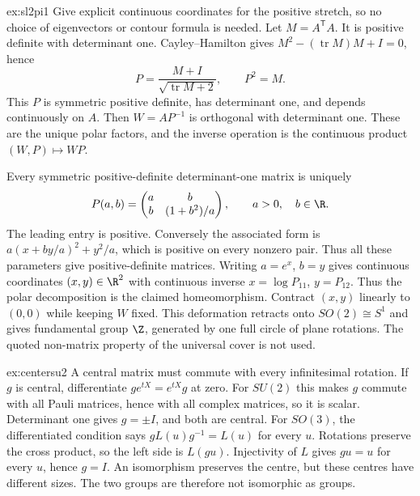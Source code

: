 \begin{solution}{ex:sl2pi1}
\idea Give explicit continuous coordinates for the positive stretch, so
no choice of eigenvectors or contour formula is needed.
\writeup Let $M=A^{\mathsf T}A$. It is positive definite with determinant
one. Cayley--Hamilton gives $M^2-(\operatorname{tr}M)M+I=0$, hence
\[
 P=\frac{M+I}{\sqrt{\operatorname{tr}M+2}},\qquad P^2=M.
\]
This $P$ is symmetric positive definite, has determinant one, and depends
continuously on $A$. Then $W=AP^{-1}$ is orthogonal with determinant
one. These are the unique polar factors, and the inverse operation is
the continuous product $(W,P)\mapsto WP$.

Every symmetric positive-definite determinant-one matrix is uniquely
\[
 P(a,b)=\begin{pmatrix}a&b\\b&(1+b^2)/a\end{pmatrix},
 \qquad a>0,\quad b\in\R.
\]
The leading entry is positive. Conversely the associated form is
$a(x+by/a)^2+y^2/a$, which is positive on every nonzero pair.
Thus all these parameters give positive-definite matrices.
Writing $a=e^x$, $b=y$ gives continuous coordinates $(x,y)\in\R^2$
with continuous inverse $x=\log P_{11}$, $y=P_{12}$.
Thus the polar decomposition is the claimed homeomorphism.
Contract $(x,y)$ linearly to $(0,0)$ while keeping $W$ fixed.
This deformation retracts onto $SO(2)\cong S^1$ and gives fundamental
group $\Z$, generated by one full circle of plane rotations.
The quoted non-matrix property of the universal cover is not used.
\end{solution}
\begin{solution}{ex:centersu2}
\idea A central matrix must commute with every infinitesimal rotation.
\writeup If $g$ is central, differentiate $ge^{tX}=e^{tX}g$ at zero.
For $SU(2)$ this makes $g$ commute with all Pauli matrices, hence with
all complex matrices, so it is scalar. Determinant one gives $g=\pm I$,
and both are central.
For $SO(3)$, the differentiated condition says
$gL(u)g^{-1}=L(u)$ for every $u$.
Rotations preserve the cross product, so the left side is $L(gu)$.
Injectivity of $L$ gives $gu=u$ for every $u$, hence $g=I$.
An isomorphism preserves the centre, but these centres have different
sizes. The two groups are therefore not isomorphic as groups.
\end{solution}

